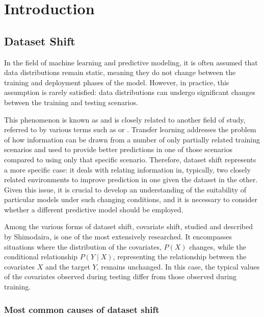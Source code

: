 \chapter{Introduction}


\section{Dataset Shift}


In the field of machine learning and predictive modeling, it is often assumed that data distributions remain static, meaning they do not change between the training and deployment phases of the model. However, in practice, this assumption is rarely satisfied: data distributions can undergo significant changes between the training and testing scenarios.

This phenomenon is known as \cite{shiftbook} and is closely related to another field of study, referred to by various terms such as  or . Transfer learning addresses the problem of how information can be drawn from a number of only partially related training scenarios and used to provide better predictions in one of those scenarios compared to using only that specific scenario. Therefore, dataset shift represents a more specific case: it deals with relating information in, typically, two closely related environments to improve prediction in one given the dataset in the other. Given this issue, it is crucial to develop an understanding of the suitability of particular models under such changing conditions, and it is necessary to consider whether a different predictive model should be employed.

Among the various forms of dataset shift, covariate shift, studied and described by Shimodaira\cite{SHIMODAIRA2000227}, is one of the most extensively researched. It encompasses situations where the distribution of the covariates, $P(X)$ changes, while the conditional relationship $P(Y \mid X)$, representing the relationship between the covariates $X$ and the target $Y$, remains unchanged. In this case, the typical values of the covariates observed during testing differ from those observed during training.

	
\subsection{Most common causes of dataset shift}
	

